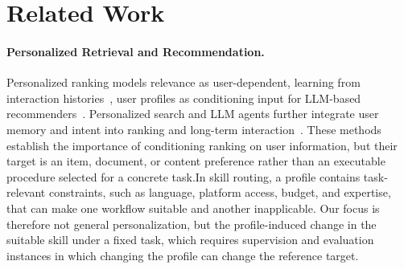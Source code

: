 \documentclass[letterpaper]{article} %
\begin{document}
\section{Related Work}
\label{sec:related_work}

\paragraph{Personalized Retrieval and Recommendation.}
Personalized ranking models relevance as user-dependent, learning from
interaction histories~\citep{koren2009matrix,rendle2009bpr}, user profiles
as conditioning input for LLM-based recommenders~\citep{deldjoo2024reviewmodernrecommendersystems,
bang2026llmbaseduserprofilemanagement}. Personalized search and LLM agents further integrate
user memory and intent into ranking and long-term interaction~\citep{zhou2024cognitivepersonalizedsearchintegrating,
enablingpersonalizedlongterminteractions}. These methods establish the importance of conditioning ranking on user information, but their target is an item, document, or content preference rather than an executable procedure selected for a concrete task.In skill routing, a profile contains task-relevant constraints, such as language, platform access, budget, and expertise, that can make one workflow suitable and another inapplicable. Our focus is therefore not general personalization, but the profile-induced change in the suitable skill under a fixed task, which requires supervision and evaluation instances in which
changing the profile can change the reference target.
\end{document}
